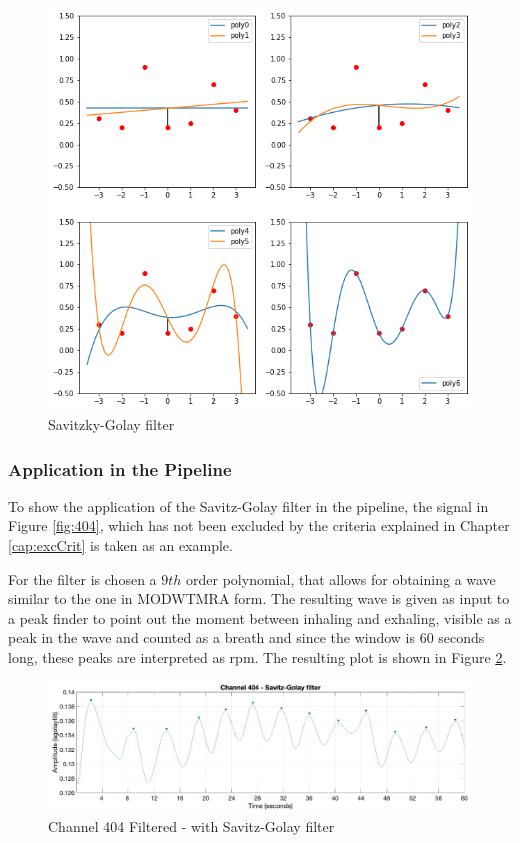 \begin{figure}[p]
    \centering
    \includegraphics[width=\textwidth]{img/sg_expl.png}
    \caption{Savitzky-Golay filter}
    \label{fig:4sg explain}
\end{figure}



\subsubsection{Application in the Pipeline}

To show the application of the Savitz-Golay filter in the pipeline, the signal in Figure \ref{fig:404}, which has not been excluded by the criteria explained in Chapter \ref{cap:excCrit} is taken as an example.

For the filter is chosen a $9th$ order polynomial, that allows for obtaining a wave similar to the one in MODWTMRA form.
The resulting wave is given as input to a peak finder to point out the moment between inhaling and exhaling, visible as a peak in the wave and counted as a breath and since the window is 60 seconds long, these peaks are interpreted as rpm. The resulting plot is shown in Figure \ref{fig:404sg}.

\vspace*{0.5cm}

\begin{figure}[H]
    \centering
    \includegraphics[width=\textwidth]{img/404sg.jpg}
    \caption{Channel 404 Filtered - with Savitz-Golay filter}
    \label{fig:404sg}
\end{figure}

